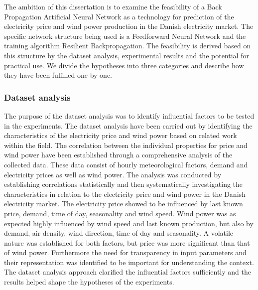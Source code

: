 The ambition of this dissertation is to examine the feasibility of a Back Propagation Artificial Neural Network as a technology for prediction of the electricity price and wind power production in the Danish electricity market. The specific network structure being used is a Feedforward Neural Network and the training algorithm Resilient Backpropagation. The feasibility is derived based on this structure by the dataset analysis, experimental results and the potential for practical use. We divide the hypotheses into three categories and describe how they have been fulfilled one by one.

\subsubsection{Dataset analysis}
The purpose of the dataset analysis was to identify influential factors to be tested in the experiments. The dataset analysis have been carried out by identifying the characteristics of the electricity price and wind power based on related work within the field. The correlation between the individual properties for price and wind power have been established through a comprehensive analysis of the collected data. These data consist of hourly meteorological factors, demand and electricity prices as well as wind power. The analysis was conducted by establishing correlations statistically and then systematically investigating the characteristics in relation to the electricity price and wind power in the Danish electricity market. The electricity price showed to be influenced by last known price, demand, time of day, seasonality and wind speed. Wind power was as expected highly influenced by wind speed and last known production, but also by demand, air density, wind direction, time of day and seasonality. A volatile nature was established for both factors, but price was more significant than that of wind power. Furthermore the need for transparency in input parameters and their representation was identified to be important for understanding the context. The dataset analysis approach clarified the influential factors sufficiently and the results helped shape the hypotheses of the experiments. 
